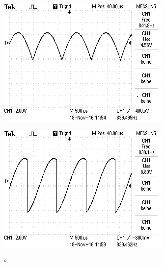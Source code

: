 \begin{figure}[!h]
\begin{minipage}[t]{0.3\textwidth}
    \label{fig:45}
    \caption{\si{\degree}}
  \end{minipage}
  \hspace{12pt}
  \vspace{5pt}
  \begin{minipage}[t]{0.3\textwidth}
    \includegraphics[width=\textwidth]{Bilder/105.jpeg}
    \label{fig:105}
    \caption{\si{\degree}}
  \end{minipage}
  \hspace{12pt}
  \vspace{5pt}
  \begin{minipage}[t]{0.3\textwidth}
    \includegraphics[width=\textwidth]{Bilder/165.jpeg}
    \label{fig:165}
    \caption{\si{\degree}}

\end{minipage}
\end{figure}
